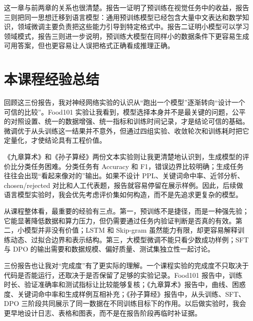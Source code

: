 \documentclass[a4paper,11pt,twocolumn]{article}
\begin{document}
这一章与前两章的关系也很清楚。报告一证明了预训练在视觉任务中的收益，报告三则把同一思想迁移到语言模型：通用预训练模型已经包含大量中文表达和数学知识，领域微调主要负责把这些能力引导到特定格式中。报告二证明小模型可以学习领域模式，报告三则进一步说明，预训练大模型在同样小的数据条件下更容易生成可用答案，但也更容易让人误把格式正确看成推理正确。

\section{本课程经验总结}

回顾这三份报告，我对神经网络实验的认识从“跑出一个模型”逐渐转向“设计一个可信的比较”。Food101 实验让我看到，模型选择本身并不是最关键的问题，公平的对照设置、统一的数据增强、统一指标和训练时间记录，才是结论可信的基础。微调优于从头训练这一结果并不意外，但通过四组实验、收敛轮次和训练耗时把它定量化，才使结论具有工程价值。

《九章算术》和《孙子算经》两份文本实验则让我更清楚地认识到，生成模型的评价比分类任务困难。分类任务有 Accuracy 和 F1，错误边界比较明确；生成任务往往会出现“看起来像对的”输出。如果不设计 PPL、关键词命中率、近邻分析、chosen/rejected 对比和人工代表题，报告就容易停留在展示样例。因此，后续做语言模型实验时，我会优先考虑评价集如何构造，而不是先追求更复杂的模型。

从课程整体看，最重要的经验有三点。第一，预训练不是捷径，而是一种强先验；它能显著降低数据和算力压力，但仍需要通过任务内验证判断是否真的有效。第二，小模型并非没有价值；LSTM 和 Skip-gram 虽然能力有限，却更容易解释训练动态、过拟合边界和表示结构。第三，大模型微调不能只看少数成功样例；SFT 与 DPO 的输出需要和数据规模、偏好质量、测试集独立性一起讨论。

三份报告也让我对“完成度”有了更实际的理解。一个课程实验的完成度不只取决于代码是否能运行，还取决于是否保留了足够的实验记录。Food101 报告中，训练时长、验证准确率和测试指标让比较能够复核；《九章算术》报告中，曲线、困惑度、关键词命中率和生成样例互相补充；《孙子算经》报告中，从头训练、SFT、DPO 三阶段共同展示了同一数据在不同训练目标下的作用。以后做实验时，我会更早地设计日志、表格和图表，而不是在报告阶段再临时补证据。

\begin{table}[H]
\centering
\scriptsize
\caption{三份报告带来的课程经验}
\end{table}
\end{document}
